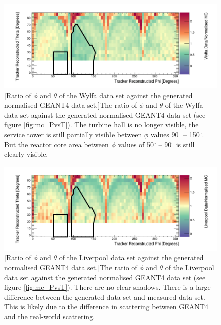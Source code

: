 \begin{figure}[!h]
 \centering
 \includegraphics[width=\linewidth]{Chapter6/Figs/WylfaCryRatioPartialOutlines.png}
 [Ratio of $\phi$ and $\theta$ of the Wylfa data set against the generated normalised GEANT4 data set.]{The ratio of $\phi$ and $\theta$ of the Wylfa data set against the generated normalised GEANT4 data set (see figure \ref{fig:mc_PvsT}). The turbine hall is no longer visible, the service tower is still partially visible between $\phi$ values 90$^\circ$ -- 150$^\circ$. But the reactor core area between $\phi$ values of 50$^\circ$ -- 90$^\circ$ is still clearly visible. }
 \label{fig:WylfaToMCRatio}
\end{figure}

\begin{figure}[!h]
 \centering
 \includegraphics[width=\linewidth]{Chapter6/Figs/LiverpoolCryRatioPartialOutlines.png}
 [Ratio of $\phi$ and $\theta$ of the Liverpool data set against the generated normalised GEANT4 data set.]{The ratio of $\phi$ and $\theta$ of the Liverpool data set against the generated normalised GEANT4 data set (see figure \ref{fig:mc_PvsT}). There are no clear shadows. There is a large difference between the generated data set and measured data set. This is likely due to the difference in scattering between GEANT4 and the real-world scattering.}
 \label{fig:LiverpoolToMCRatio}
\end{figure}


